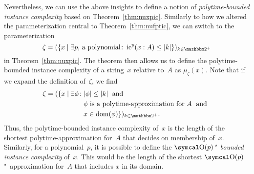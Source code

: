 Nevertheless, we can use the above insights to define a notion of \emph{polytime-bounded instance complexity} based on Theorem~\ref{thm:nuxpic}.
Similarly to how we altered the parameterization central to Theorem~\ref{thm:nufptic}, we can switch to the parameterization
\begin{equation*}
  \zeta \deq (\{x \st \exists p\text{, a polynomial}\colon \ic^p(x : A) \le \length{k}\})_{k \in \binary^+}
\end{equation*}
in Theorem~\ref{thm:nuxpic}.
The theorem then allows us to define the polytime-bounded instance complexity of a string~$x$ relative to~$A$ as $\mu_\zeta(x)$.
Note that if we expand the definition of~$\zeta$, we find
\begin{align*}
  \zeta = (\{x \st \exists \phi\colon &\length{\phi} \le \length{k} \reland \\
  	&\text{$\phi$ is a polytime-approximation for $A$} \reland \\
  	&x \in \dom(\phi)\})_{k \in \binary^+}.
\end{align*}
Thus, the polytime-bounded instance complexity of~$x$ is the length of the shortest polytime-approximation for~$A$ that decides on membership of~$x$.
Similarly, for a polynomial~$p$, it is possible to define the \emph{$\bigO(p)$"~bounded instance complexity} of~$x$.
This would be the length of the shortest $\bigO(p)$"~approximation for~$A$ that includes $x$ in its domain.

